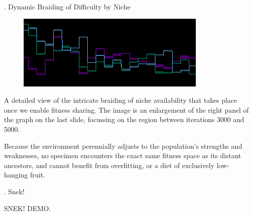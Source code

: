 \documentclass[9pt]{beamer}
\begin{document}
\begin{frame}{\theframenumber. Dynamic Braiding of Difficulty by Niche}
  \begin{figure}
    \includegraphics[width=\textwidth]{../images/braiding.png}
  \end{figure}
  A detailed view of the intricate braiding of niche availability that takes place once we enable fitness sharing. The image is an enlargement of the right panel of the graph on the last slide, focussing on the region between iterations 3000 and 5000.
\vspace{8pt}


  Because the environment perennially adjusts to the population's strengths and weaknesses, no specimen encounters the exact same fitness space as its distant ancestors, and cannot benefit from overfitting, or a diet of exclusively low-hanging fruit.
\end{frame}

\begin{frame}{\theframenumber. Snek!}

  SNEK!
  DEMO.


\end{frame}
\end{document}
